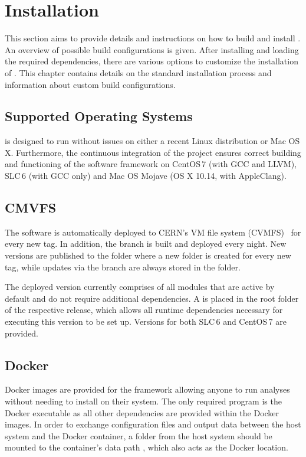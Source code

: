 \chapter{Installation}
\label{ch:installation}

This section aims to provide details and instructions on how to build and install \corry.
An overview of possible build configurations is given.
After installing and loading the required dependencies, there are various options to customize the installation of \corry.
This chapter contains details on the standard installation process and information about custom build configurations.

\section{Supported Operating Systems}
\label{sec:os}
\corry is designed to run without issues on either a recent Linux distribution or Mac OS\,X.
Furthermore, the continuous integration of the project ensures correct building and functioning of the software framework on CentOS\,7 (with GCC and LLVM), SLC\,6 (with GCC only) and Mac OS Mojave (OS X 10.14, with AppleClang).

\section{CMVFS}
\label{sec:cvmfs_install}
The software is automatically deployed to CERN's VM file system (CVMFS)~\cite{cvmfs} for every new tag.
In addition, the  branch is built and deployed every night.
New versions are published to the folder  where a new folder is created for every new tag, while updates via the  branch are always stored in the  folder.

The deployed version currently comprises of all modules that are active by default and do not require additional dependencies.
A  is placed in the root folder of the respective release, which allows all runtime dependencies necessary for executing this version to be set up.
Versions for both SLC\,6 and CentOS\,7 are provided.

\section{Docker}
\label{sec:docker}
Docker images are provided for the framework allowing anyone to run analyses without needing to install \corry on their system.
The only required program is the Docker executable as all other dependencies are provided within the Docker images.
In order to exchange configuration files and output data between the host system and the Docker container, a folder from the host system should be mounted to the container's data path , which also acts as the Docker  location.


